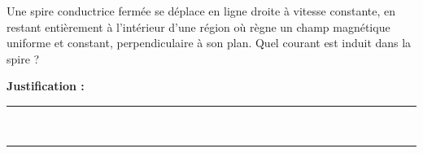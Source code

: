 Une spire conductrice fermée se déplace en ligne droite à vitesse constante, en restant entièrement à l'intérieur d'une région où règne un champ magnétique uniforme et constant, perpendiculaire à son plan. Quel courant est induit dans la spire ?

\choices

\noindent\textbf{Justification :} \hrulefill \\[2.5ex]
\rule{\linewidth}{0.4pt} \\[2.5ex]
\rule{\linewidth}{0.4pt}
\vfill
